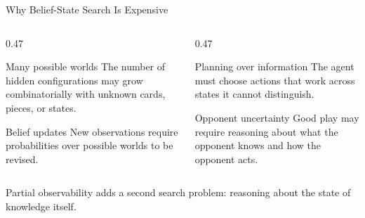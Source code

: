 \documentclass[aspectratio=169,10pt]{beamer}
\begin{document}
\begin{frame}[shrink=18]{Why Belief-State Search Is Expensive}
  \begin{columns}[T,onlytextwidth]
    \begin{column}{0.47\textwidth}
      \begin{block}{Many possible worlds}
        The number of hidden configurations may grow combinatorially with unknown cards, pieces, or states.
      \end{block}
      \begin{block}{Belief updates}
        New observations require probabilities over possible worlds to be revised.
      \end{block}
    \end{column}
    \begin{column}{0.47\textwidth}
      \begin{block}{Planning over information}
        The agent must choose actions that work across states it cannot distinguish.
      \end{block}
      \begin{block}{Opponent uncertainty}
        Good play may require reasoning about what the opponent knows and how the opponent acts.
      \end{block}
    \end{column}
  \end{columns}
  \begin{keyidea}
    Partial observability adds a second search problem: reasoning about the state of knowledge itself.
  \end{keyidea}
\end{frame}
\end{document}
